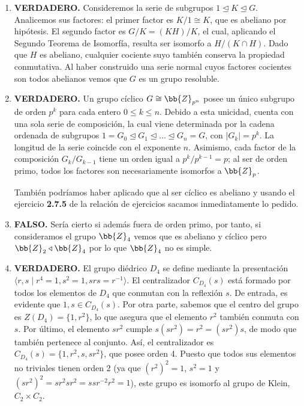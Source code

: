 \documentclass[12pt]{article}
\begin{document}
\begin{ejercicio}[1.0 punto]
\begin{enumerate}[label=\arabic*)]
            \item \textbf{VERDADERO.} 
            Consideremos la serie de subgrupos $1 \trianglelefteq K \trianglelefteq G$.
            Analicemos sus factores: el primer factor es $K/1 \cong K$, que es abeliano por hipótesis. 
            El segundo factor es $G/K = (KH)/K$, el cual, aplicando el Segundo Teorema de Isomorfía, resulta ser isomorfo a $H/(K \cap H)$. Dado que $H$ es abeliano, cualquier cociente suyo también conserva la propiedad conmutativa. 
            Al haber construido una serie normal cuyos factores cocientes son todos abelianos vemos que $G$ es un grupo resoluble.
            
            \item \textbf{VERDADERO.} 
            Un grupo cíclico $G \cong \bb{Z}_{p^n}$ posee un único subgrupo de orden $p^k$ para cada entero $0 \le k \le n$.
            Debido a esta unicidad, cuenta con una sola serie de composición, la cual viene determinada por la cadena ordenada de subgrupos $1 = G_0 \trianglelefteq G_1 \trianglelefteq \dots \trianglelefteq G_n = G$, con $|G_k| = p^k$.
            La longitud de la serie coincide con el exponente $n$. Asimismo, cada factor de la composición $G_k/G_{k-1}$ tiene un orden igual a $p^k/p^{k-1} = p$; al ser de orden primo, todos los factores son necesariamente isomorfos a $\bb{Z}_p$.

            También podríamos haber aplicado que al ser cíclico es abeliano y usando el ejercicio \textbf{2.7.5} de la relación de ejercicios sacamos inmediatamente lo pedido.
            
            \item \textbf{FALSO.} 
            Sería cierto si además fuera de orden primo, por tanto, si consideramos el grupo $\bb{Z}_4$ vemos que es abeliano y cíclico pero $\bb{Z}_2 \triangleleft \bb{Z}_4$ por lo que $\bb{Z}_4$ no es simple.
            
            \item \textbf{VERDADERO.} El grupo diédrico $D_4$ se define mediante la presentación $\langle r, s \mid r^4=1, s^2=1, srs=r^{-1}\rangle$. El centralizador $C_{D_4}(s)$ está formado por todos los elementos de $D_4$ que conmutan con la reflexión $s$. De entrada, es evidente que $1, s \in C_{D_4}(s)$. Por otra parte, sabemos que el centro del grupo es $Z(D_4) = \{1, r^2\}$, lo que asegura que el elemento $r^2$ también conmuta con $s$. Por último, el elemento $sr^2$ cumple $s(sr^2) = r^2 = (sr^2)s$, de modo que también pertenece al conjunto. Así, el centralizador es $C_{D_4}(s) = \{1, r^2, s, sr^2\}$, que posee orden 4. Puesto que todos sus elementos no triviales tienen orden 2 (ya que $(r^2)^2=1$, $s^2=1$ y $(sr^2)^2 = sr^2sr^2 = ssr^{-2}r^2 = 1$), este grupo es isomorfo al grupo de Klein, $C_2 \times C_2$.
            

\end{enumerate}
\end{ejercicio}
\end{document}
